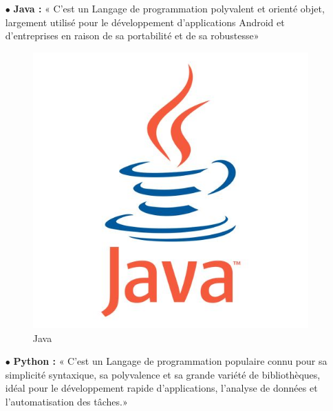 \begin{itemize}
    \item[$\bullet$] \textbf{ Java :}
          « C'est un Langage de programmation polyvalent et orienté objet, largement utilisé pour le développement d'applications Android et d'entreprises en raison de sa portabilité et de sa robustesse»

          \begin{figure}[ht]
              \centering \includegraphics[scale=0.19]{chap1.images/java.jpg}
              \caption{Java}
              \label{JAVA}
          \end{figure}



    \item[$\bullet$] \textbf{ Python :}
          « C'est un Langage de programmation populaire connu pour sa simplicité syntaxique, sa polyvalence et sa grande variété de bibliothèques, idéal pour le développement rapide d'applications, l'analyse de données et l'automatisation des tâches.»


\end{itemize}
